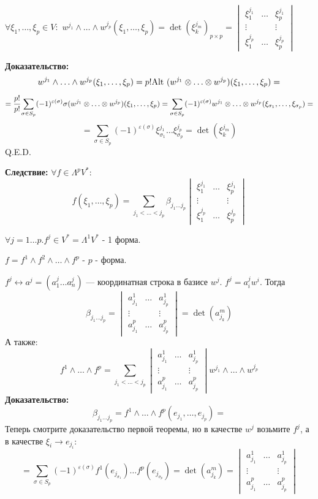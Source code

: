 $\forall \xi_1,\ldots, \xi_p \in V:$ $w^{j_1}\wedge \ldots \wedge w^{j_p} (\xi_1,\ldots,\xi_p) = \det(\xi^{j_m}_k)_{p\times p} = \begin{vmatrix}
    \xi_1^{j_1} & \ldots & \xi_p^{j_1}\\
    \vdots & & \vdots \\
    \xi_1^{j_p} & \ldots & \xi_p^{j_p}
\end{vmatrix}$

\textbf{Доказательство:}
$$w^{j_1}\wedge \ldots \wedge w^{j_p} (\xi_1,\ldots,\xi_p) = p! \text{Alt } (w^{j_1}\otimes \ldots  \otimes w^{j_p})(\xi_1,\ldots,\xi_p) =$$
$$=\cfrac{p!}{p!} \sum\limits_{\sigma \in S_p}(-1)^{\varepsilon(\sigma)}\sigma(w^{j_1}\otimes \ldots \otimes w^{j_p})(\xi_1,\ldots,\xi_p) = \sum_{\sigma \in S_p} (-1)^{\varepsilon(\sigma)}w^{j_1}\otimes \ldots \otimes w^{j_p}(\xi_{\sigma_1},\ldots ,\xi_{\sigma_p}) = $$
$$= \sum\limits_{\sigma\in S_p}(-1)^{\varepsilon(\sigma)}\xi_{\sigma_1}^{j_1}\ldots \xi_{\sigma_p}^{j_p} = \det(\xi_k^{j_m})$$
\hfill Q.E.D.


\textbf{Следствие:} $\forall f \in \Lambda^p V^*$:
$$f(\xi_1, \ldots,\xi_p)=\sum\limits_{j_1<\ldots<j_p}\beta_{j_1\ldots j_p} \begin{vmatrix}
\xi_1^{j_1}&\ldots& \xi_p^{j_1}\\
\vdots & & \vdots \\
\xi_1^{j_p} & \ldots & \xi_p^{j_p}
\end{vmatrix}$$ 


$\forall j = 1\ldots p. f^j \in V^* = \Lambda^1V^*$ - 1 форма.

$f= f^1 \wedge f^2 \wedge \ldots \wedge f^p$ - $p$ - форма.

$f^j \leftrightarrow a^j = (a_1^j \ldots a_n^j)$ --- координатная строка в базисе $w^j$. $f^j= a_i^j w^i$. Тогда 
$$\beta_{j_1\ldots j_p}= \begin{vmatrix}
    a_{j_1}^1 & \ldots & a_{j_p}^{1}\\
    \vdots & & \vdots \\
    a_{j_1}^p & \ldots & a_{j_p}^p
\end{vmatrix} = \det (a_{j_k}^m)$$
А также: 
$$f^1 \wedge \ldots \wedge f^p = \sum\limits_{j_1 < \ldots < j_p}\begin{vmatrix}
    a_{j_1}^1 & \ldots & a_{j_p}^1 \\
    \vdots & & \vdots \\
    a^p_{j_1} & \ldots & a_{j_p}^p 
\end{vmatrix} w^{j_1}\wedge \ldots \wedge w^{j_p}$$
\textbf{Доказательство:}
$$\beta_{j_1\ldots j_p}= f^1\wedge \ldots \wedge f^p (e_{j_1},\ldots, e_{j_p})=$$
Теперь смотрите доказательство первой теоремы, но в качестве $w^j$ возьмите $f^j$, а в качестве $\xi_i \rightarrow e_{j_i}$:
$$= \sum\limits_{\sigma \in S_p} (-1)^{\varepsilon(\sigma)}f^1(e_{j_{\sigma_1}})\ldots f^p(e_{j_{\sigma_p}}) = \det (a_{j_{k}}^m) = \begin{vmatrix}
    a_{j_1}^1 & \ldots & a_{j_p}^1\\
    \vdots & & \vdots \\
    a_{j_1}^p & \ldots & a_{j_p}^p
\end{vmatrix} $$


